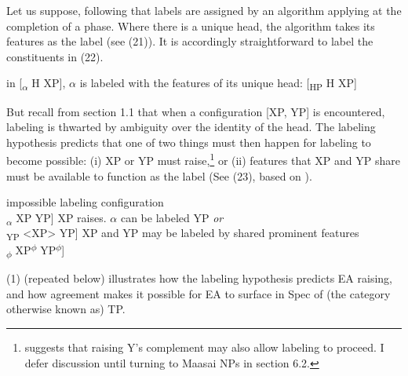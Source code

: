\documentclass[output=paper
,modfonts
,nonflat]{langsci/langscibook}
\begin{document}
Let us suppose, following \citet{Chomsky2013, Chomsky2015} that labels are assigned by an algorithm applying at the completion of a phase. Where there is a unique head, the algorithm takes its features as the label (see (21)). It is accordingly straightforward to label the constituents in (22).

\begin{exe}
\ex in [\textsubscript{$\alpha$} H XP], $\alpha$ is labeled with the features of its unique head: [\textsubscript{HP} H XP] 
\end{exe}
\begin{exe}
	\ex \oneline{{\lbrack}\textsubscript{$\alpha$} buy [\textsubscript{$\beta$} a [\textsubscript{$\gamma$} \textit{n} book]]]      \textit{is labeled} {\lbrack}\textsubscript{VP} buy [\textsubscript{DP} a [\textsubscript{nP} \textit{n} book]]{\rbrack}}
\end{exe}
But recall from section 1.1 that when a configuration [XP, YP] is encountered, labeling is thwarted by ambiguity over the identity of the head. The labeling hypothesis predicts that one of two things must then happen for labeling to become possible: (i) XP or YP must raise,\footnote{\citet{Chomsky2015} suggests that raising Y’s complement may also allow labeling to proceed. I defer discussion until turning to Maasai NPs in section 6.2.}  or (ii) features that XP and YP share must be available to function as the label (See  (23), based on \citealt[44]{Chomsky2013}).

\begin{exe}
	\ex 
	\xlist
	\ex impossible labeling configuration\\
	{\lbrack}\textsubscript{$\alpha$} XP YP] 
	\ex XP raises. ${\alpha}$ can be labeled YP  \textit{or}\\
	{\lbrack}\textsubscript{YP} <XP> YP] 
	\ex XP and YP may be labeled by shared prominent features\\
	{\lbrack}\textsubscript{$\phi$} XP\textsuperscript{$\phi$} YP\textsuperscript{$\phi$}] 
	\endxlist
\end{exe}
(1) (repeated below) illustrates how the labeling hypothesis predicts EA raising, and how agreement makes it possible for EA to surface in Spec of (the category otherwise known as) TP.
\end{document}
